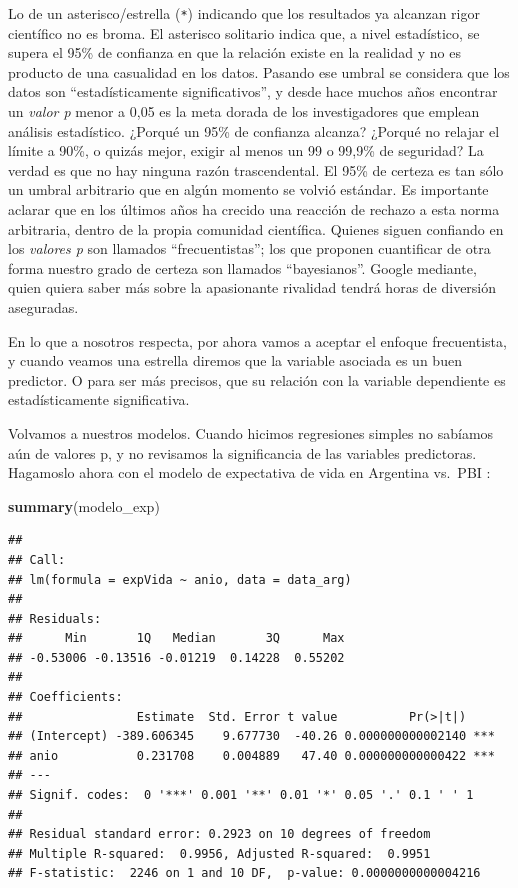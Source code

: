 \documentclass[spanish,]{book}
\newenvironment{Shaded}{\begin{snugshade}}{\end{snugshade}}
\newcommand{\KeywordTok}[1]{\textcolor[rgb]{0.13,0.29,0.53}{\textbf{#1}}}
\newcommand{\NormalTok}[1]{#1}
\begin{document}
Lo de un asterisco/estrella (\texttt{*}) indicando que los resultados ya alcanzan rigor científico no es broma. El asterisco solitario indica que, a nivel estadístico, se supera el 95\% de confianza en que la relación existe en la realidad y no es producto de una casualidad en los datos. Pasando ese umbral se considera que los datos son ``estadísticamente significativos'', y desde hace muchos años encontrar un \emph{valor p} menor a 0,05 es la meta dorada de los investigadores que emplean análisis estadístico. ¿Porqué un 95\% de confianza alcanza? ¿Porqué no relajar el límite a 90\%, o quizás mejor, exigir al menos un 99 o 99,9\% de seguridad? La verdad es que no hay ninguna razón trascendental. El 95\% de certeza es tan sólo un umbral arbitrario que en algún momento se volvió estándar. Es importante aclarar que en los últimos años ha crecido una reacción de rechazo a esta norma arbitraria, dentro de la propia comunidad científica. Quienes siguen confiando en los \emph{valores p} son llamados ``frecuentistas''; los que proponen cuantificar de otra forma nuestro grado de certeza son llamados ``bayesianos''. Google mediante, quien quiera saber más sobre la apasionante rivalidad tendrá horas de diversión aseguradas.

En lo que a nosotros respecta, por ahora vamos a aceptar el enfoque frecuentista, y cuando veamos una estrella diremos que la variable asociada es un buen predictor. O para ser más precisos, que su relación con la variable dependiente es estadísticamente significativa.

Volvamos a nuestros modelos. Cuando hicimos regresiones simples no sabíamos aún de valores p, y no revisamos la significancia de las variables predictoras. Hagamoslo ahora con el modelo de expectativa de vida en Argentina vs.~PBI :

\begin{Shaded}
\begin{Highlighting}[]
\KeywordTok{summary}\NormalTok{(modelo_exp)}
\end{Highlighting}
\end{Shaded}

\begin{verbatim}
## 
## Call:
## lm(formula = expVida ~ anio, data = data_arg)
## 
## Residuals:
##      Min       1Q   Median       3Q      Max 
## -0.53006 -0.13516 -0.01219  0.14228  0.55202 
## 
## Coefficients:
##                Estimate  Std. Error t value          Pr(>|t|)    
## (Intercept) -389.606345    9.677730  -40.26 0.000000000002140 ***
## anio           0.231708    0.004889   47.40 0.000000000000422 ***
## ---
## Signif. codes:  0 '***' 0.001 '**' 0.01 '*' 0.05 '.' 0.1 ' ' 1
## 
## Residual standard error: 0.2923 on 10 degrees of freedom
## Multiple R-squared:  0.9956, Adjusted R-squared:  0.9951 
## F-statistic:  2246 on 1 and 10 DF,  p-value: 0.0000000000004216
\end{verbatim}
\end{document}
